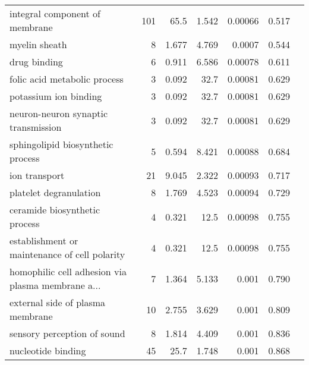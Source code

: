 \begin{longtable}{|l|r|r|r|r|r|}
                    integral component of membrane &                     101 &                    65.5 &      1.542 &              0.00066 &                        0.517~~ \\
                                     myelin sheath &                       8 &                   1.677 &      4.769 &               0.0007 &                        0.544~~ \\
                                      drug binding &                       6 &                   0.911 &      6.586 &              0.00078 &                        0.611~~ \\
                      folic acid metabolic process &                       3 &                   0.092 &       32.7 &              0.00081 &                        0.629~~ \\
                             potassium ion binding &                       3 &                   0.092 &       32.7 &              0.00081 &                        0.629~~ \\
               neuron-neuron synaptic transmission &                       3 &                   0.092 &       32.7 &              0.00081 &                        0.629~~ \\
                 sphingolipid biosynthetic process &                       5 &                   0.594 &      8.421 &              0.00088 &                        0.684~~ \\
                                     ion transport &                      21 &                   9.045 &      2.322 &              0.00093 &                        0.717~~ \\
                            platelet degranulation &                       8 &                   1.769 &      4.523 &              0.00094 &                        0.729~~ \\
                     ceramide biosynthetic process &                       4 &                   0.321 &       12.5 &              0.00098 &                        0.755~~ \\
     establishment or maintenance of cell polarity &                       4 &                   0.321 &       12.5 &              0.00098 &                        0.755~~ \\
 homophilic cell adhesion via plasma membrane a... &                       7 &                   1.364 &      5.133 &                0.001 &                        0.790~~ \\
                  external side of plasma membrane &                      10 &                   2.755 &      3.629 &                0.001 &                        0.809~~ \\
                       sensory perception of sound &                       8 &                   1.814 &      4.409 &                0.001 &                        0.836~~ \\
                                nucleotide binding &                      45 &                    25.7 &      1.748 &                0.001 &                        0.868~~ \\
\end{longtable}

